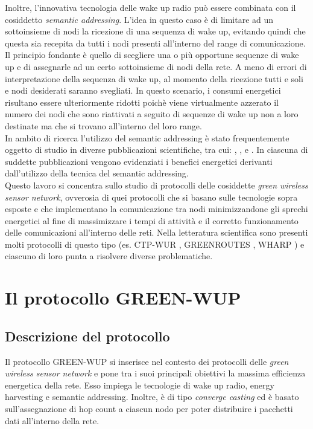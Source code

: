 \documentclass[binding=0.6cm,TFA]{sapthesis}
\begin{document}
\newpage
Inoltre, l'innovativa tecnologia delle wake up radio può essere combinata con il cosiddetto \emph{semantic addressing}. L'idea in questo caso è di limitare
ad un sottoinsieme di nodi la ricezione di una sequenza di wake up, evitando quindi che questa sia recepita da tutti i nodi presenti all'interno
del range di comunicazione. Il principio fondante è quello di scegliere una o più opportune sequenze di wake up e di assegnarle ad un certo
sottoinsieme di nodi della rete. A meno di errori di interpretazione della sequenza di wake up, al momento della ricezione tutti e soli e nodi desiderati
saranno svegliati. In questo scenario, i consumi energetici risultano essere ulteriormente ridotti poichè viene virtualmente azzerato il numero dei nodi
che sono riattivati a seguito di sequenze di wake up non a loro destinate ma che si trovano all'interno del loro range.\\

In ambito di ricerca l'utilizzo del semantic addressing è stato frequentemente oggetto di studio in diverse pubblicazioni scientifiche, tra cui:
\cite{novel-wake-up-receiver-paper}, \cite{beyond-duty-cycling-paper}, e \cite{ctp-wur-paper}. In ciascuna di suddette pubblicazioni vengono
evidenziati i benefici energetici derivanti dall'utilizzo della tecnica del semantic addressing.\\

Questo lavoro si concentra sullo studio di protocolli delle cosiddette \emph{green wireless sensor network}, ovverosia di quei protocolli che si basano
sulle tecnologie sopra esposte e che implementano la comunicazione tra nodi minimizzandone gli sprechi energetici al fine di massimizzare
i tempi di attività e il corretto funzionamento delle comunicazioni all'interno delle reti. Nella letteratura scientifica
sono presenti molti protocolli di questo tipo (es. CTP-WUR \cite{ctp-wur-paper}, GREENROUTES \cite{wake-up-radios-paper}, WHARP \cite{wharp-paper}) e
ciascuno di loro punta a risolvere diverse problematiche.

\chapter{Il protocollo GREEN-WUP}

\section{Descrizione del protocollo}

Il protocollo GREEN-WUP si inserisce nel contesto dei protocolli delle \emph{green wireless sensor network} e pone tra i suoi principali obiettivi
la massima efficienza energetica della rete. Esso impiega le tecnologie di wake up radio, energy harvesting e semantic addressing. Inoltre, è
di tipo \emph{converge casting} ed è basato sull'assegnazione di hop count a ciascun nodo per poter distribuire i pacchetti dati
all'interno della rete.\\
\end{document}
